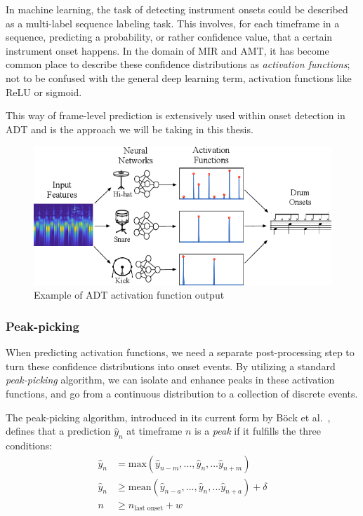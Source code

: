 In machine learning, the task of detecting instrument onsets could be described as a multi-label sequence labeling task. This involves, for each timeframe in a sequence, predicting a probability, or rather confidence value, that a certain instrument onset happens. In the domain of \gls{MIR} and \gls{AMT}, it has become common place to describe these confidence distributions as \textit{activation functions}; not to be confused with the general deep learning term, activation functions like ReLU or sigmoid.~\cite{Southall2016AutomaticDT, vogl2018multiinstrumentdrumtranscription}

This way of frame-level prediction is extensively used within onset detection in \gls{ADT} and is the approach we will be taking in this thesis.

\begin{figure}[H]
    \centering
    \includegraphics[scale=0.5]{figures/activations.png}
    \caption{Example of \gls{ADT} activation function output}
    \label{ActivationsFigure}
\end{figure}

\subsubsection{Peak-picking}

When predicting activation functions, we need a separate post-processing step to turn these confidence distributions into onset events. By utilizing a standard \textit{peak-picking} algorithm, we can isolate and enhance peaks in these activation functions, and go from a continuous distribution to a collection of discrete events.

The peak-picking algorithm, introduced in its current form by Böck et al.~\cite{Bck2012EvaluatingTO}, defines that a prediction $\hat{y}_n$ at timeframe $n$ is a \textit{peak} if it fulfills the three conditions:
\begin{align*} 
    \hat{y}_n &= \text{max}(\hat{y}_{n - m}, ..., \hat{y}_n, ... \hat{y}_{n + m}) \\ 
    \hat{y}_n &\ge \text{mean}(\hat{y}_{n - a}, ..., \hat{y}_n, ... \hat{y}_{n + a}) + \delta \\
    n &\ge n_\text{last onset} + w
\end{align*}

